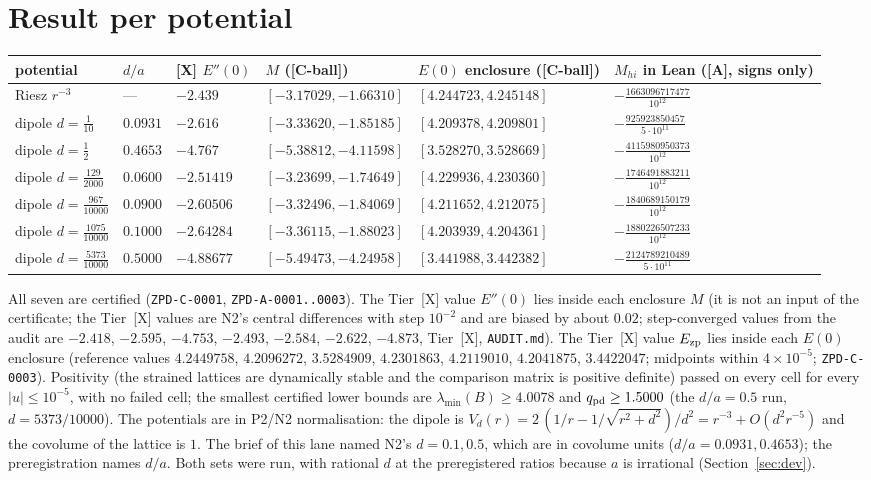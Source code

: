 \documentclass[11pt]{article}
\newcommand{\tier}[1]{\textsf{[#1]}}
\newcommand{\tA}{\tier{A}}
\newcommand{\tCb}{\tier{C-ball}}
\newcommand{\tX}{\tier{X}}
\begin{document}
\section{Result per potential}\label{sec:table}
\begin{center}\footnotesize\setlength{\tabcolsep}{2.5pt}\begin{tabular}{p{2.4cm}p{1.0cm}p{1.45cm}p{3.0cm}p{3.0cm}p{3.2cm}}\toprule
potential & $d/a$ & \tX{} $E''(0)$ & $M$ (\tCb) & $E(0)$ enclosure (\tCb) & $M_{hi}$ in Lean (\tA, signs only)\\\midrule
Riesz $r^{-3}$ & --- & $-2.439$ & $[-3.17029,-1.66310]$ & $[4.244723,4.245148]$ & $-\tfrac{1663096717477}{10^{12}}$\\
dipole $d=\tfrac1{10}$ & $0.0931$ & $-2.616$ & $[-3.33620,-1.85185]$ & $[4.209378,4.209801]$ & $-\tfrac{925923850457}{5\cdot10^{11}}$\\
dipole $d=\tfrac12$ & $0.4653$ & $-4.767$ & $[-5.38812,-4.11598]$ & $[3.528270,3.528669]$ & $-\tfrac{4115980950373}{10^{12}}$\\
dipole $d=\tfrac{129}{2000}$ & $0.0600$ & $-2.51419$ & $[-3.23699,-1.74649]$ & $[4.229936,4.230360]$ & $-\tfrac{1746491883211}{10^{12}}$\\
dipole $d=\tfrac{967}{10000}$ & $0.0900$ & $-2.60506$ & $[-3.32496,-1.84069]$ & $[4.211652,4.212075]$ & $-\tfrac{1840689150179}{10^{12}}$\\
dipole $d=\tfrac{1075}{10000}$ & $0.1000$ & $-2.64284$ & $[-3.36115,-1.88023]$ & $[4.203939,4.204361]$ & $-\tfrac{1880226507233}{10^{12}}$\\
dipole $d=\tfrac{5373}{10000}$ & $0.5000$ & $-4.88677$ & $[-5.49473,-4.24958]$ & $[3.441988,3.442382]$ & $-\tfrac{2124789210489}{5\cdot10^{11}}$\\
\bottomrule\end{tabular}\end{center}
All seven are certified (\texttt{ZPD-C-0001}, \texttt{ZPD-A-0001..0003}). The Tier~\tX{} value $E''(0)$ lies inside each enclosure $M$ (it is not an input of the certificate; the Tier~\tX{} values are N2's central differences with step $10^{-2}$ and are biased by about $0.02$; step-converged values from the audit are $-2.418$, $-2.595$, $-4.753$, $-2.493$, $-2.584$, $-2.622$, $-4.873$, Tier~\tX{}, \texttt{AUDIT.md}). The Tier~\tX{} value $E_{\rm zp}$ lies inside each $E(0)$ enclosure (reference values $4.2449758$, $4.2096272$, $3.5284909$, $4.2301863$, $4.2119010$, $4.2041875$, $3.4422047$; midpoints within $4\times10^{-5}$; \texttt{ZPD-C-0003}). Positivity (the strained lattices are dynamically stable and the comparison matrix is positive definite) passed on every cell for every $|u|\le10^{-5}$, with no failed cell; the smallest certified lower bounds are $\lambda_{\min}(B)\ge4.0078$ and $q_{\rm pd}\ge1.5000$ (the $d/a=0.5$ run, $d=5373/10000$).
The potentials are in P2/N2 normalisation: the dipole is $V_d(r)=2\,(1/r-1/\sqrt{r^2+d^2})/d^2=r^{-3}+O(d^2r^{-5})$ and the covolume of the lattice is $1$. The brief of this lane named N2's $d=0.1,0.5$, which are in covolume units ($d/a=0.0931,0.4653$); the preregistration names $d/a$. Both sets were run, with rational $d$ at the preregistered ratios because $a$ is irrational (Section~\ref{sec:dev}).
\end{document}
